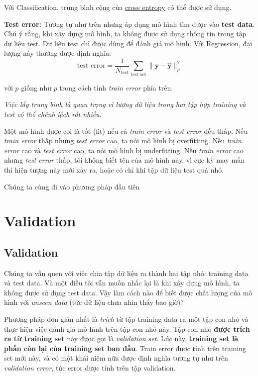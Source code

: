 Với Classification, trung bình cộng của \href{http://machinelearningcoban.com/2017/02/17/softmax/#-cross-entropy}{cross entropy} có thể được sử dụng. 
 
\textbf{Test error:} Tương tự như trên nhưng áp dụng mô hình tìm được vào \textbf{test data}. Chú ý rằng, khi xây dựng mô hình, ta không được sử dụng thông tin trong tập dữ liệu test. Dữ liệu test chỉ được dùng để đánh giá mô hình. Với Regression, đại lượng này thường được định nghĩa: 
\begin{equation*} 
\text{test error}= \frac{1}{N_{\text{test}}} \sum_{\text{test set}} \|\mathbf{y} - \mathbf{\hat{y}}\|_p^2 
\end{equation*} 
 
với $p$ giống như $p$ trong cách tính \textit{train error} phía trên. 
 
\textit{Việc lấy trung bình là quan trọng vì lượng dữ liệu trong hai tập hợp training và test có thể chênh lệch rất nhiều.} 
 
Một mô hình được coi là tốt (fit) nếu cả \textit{train error} và \textit{test error} đều thấp. Nếu \textit{train error} thấp nhưng \textit{test error} cao, ta nói mô hình bị overfitting. Nếu \textit{train error} cao và \textit{test error} cao, ta nói mô hình bị underfitting. Nếu \textit{train error} cao nhưng \textit{test error} thấp, tôi không biết tên của mô hình này, vì cực kỳ may mắn thì hiện tượng này mới xảy ra, hoặc có chỉ khi tập dữ liệu test quá nhỏ. 
 
Chúng ta cùng đi vào phương pháp đầu tiên 
 
 
\section{Validation}
 
\subsection{Validation}
Chúng ta vẫn quen với việc chia tập dữ liệu ra thành hai tập nhỏ: training data và test data. Và một điều tôi vẫn muốn nhắc lại là khi xây dựng mô hình, ta không được sử dụng test data. Vậy làm cách nào để biết được chất lượng của mô hình với \textit{unseen data} (tức dữ liệu chưa nhìn thấy bao giờ)? 
 
Phương pháp đơn giản nhất là \textit{trích} từ tập training data ra một tập con nhỏ và thực hiện việc đánh giá mô hình trên tập con nhỏ này. Tập con nhỏ \textbf{được trích ra từ training set} này được gọi là \textit{validation set}. Lúc này, \textbf{training set là phần còn lại của training set ban đầu}. Train error được tính trên training set mới này, và có một khái niệm nữa được định nghĩa tương tự như trên \textit{validation error}, tức error được tính trên tập validation. 
 
